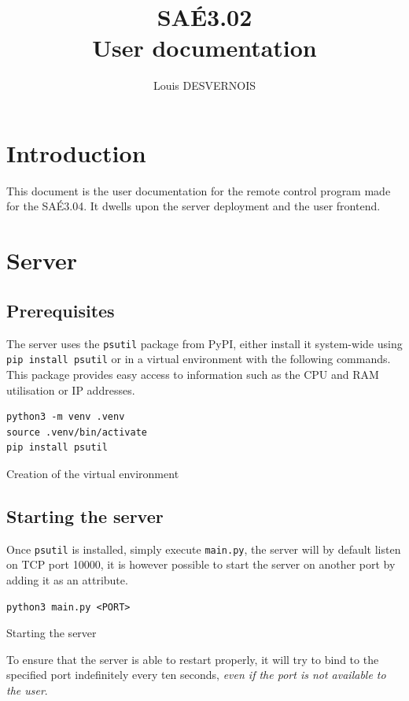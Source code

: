 \documentclass{article}
\author{Louis DESVERNOIS}
\title{%
    SAÉ3.02 \\
    \large User documentation}
\begin{document}
\maketitle
\tableofcontents
\listoffigures
\listoflistings

\newpage
\section{Introduction}
This document is the user documentation for the remote control program made for
the SAÉ3.04. It dwells upon the server deployment and the user frontend.

\section{Server}
\subsection{Prerequisites}
The server uses the \verb|psutil| package from PyPI, either install it
system-wide using \verb|pip install psutil| or in a virtual environment with the
following commands. This package provides easy access to information such as the
CPU and RAM utilisation or IP addresses.

\begin{listing}[H]
    \begin{verbatim}
python3 -m venv .venv
source .venv/bin/activate
pip install psutil
    \end{verbatim}
    \caption{Creation of the virtual environment}
    \label{venv:creation}
\end{listing}

\subsection{Starting the server}
Once \verb|psutil| is installed, simply execute \verb|main.py|, the server will
by default listen on TCP port 10000, it is however possible to start the server
on another port by adding it as an attribute.

\begin{listing}[H]
    \begin{verbatim}
python3 main.py <PORT>
    \end{verbatim}
    \caption{Starting the server}
    \label{venv:startingserver}
\end{listing}

To ensure that the server is able to restart properly, it will try to bind to
the specified port indefinitely every ten seconds, \emph{even if the port is not
available to the user}.
\end{document}
